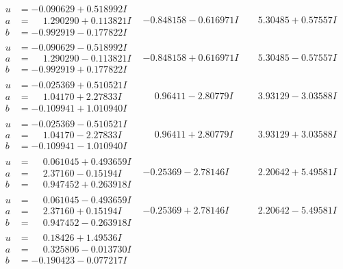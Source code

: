 \documentclass[1p]{elsarticle_modified}
\theoremstyle{definition}
\begin{document}
$$\begin{array}{c|c|c}
\begin{aligned}
u &= -0.090629 + 0.518992 I \\
a &= \phantom{-}1.290290 + 0.113821 I \\
b &= -0.992919 - 0.177822 I\end{aligned}
 & -0.848158 - 0.616971 I & \phantom{-}5.30485 + 0.57557 I \\ \hline\begin{aligned}
u &= -0.090629 - 0.518992 I \\
a &= \phantom{-}1.290290 - 0.113821 I \\
b &= -0.992919 + 0.177822 I\end{aligned}
 & -0.848158 + 0.616971 I & \phantom{-}5.30485 - 0.57557 I \\ \hline\begin{aligned}
u &= -0.025369 + 0.510521 I \\
a &= \phantom{-}1.04170 + 2.27833 I \\
b &= -0.109941 + 1.010940 I\end{aligned}
 & \phantom{-}0.96411 - 2.80779 I & \phantom{-}3.93129 - 3.03588 I \\ \hline\begin{aligned}
u &= -0.025369 - 0.510521 I \\
a &= \phantom{-}1.04170 - 2.27833 I \\
b &= -0.109941 - 1.010940 I\end{aligned}
 & \phantom{-}0.96411 + 2.80779 I & \phantom{-}3.93129 + 3.03588 I \\ \hline\begin{aligned}
u &= \phantom{-}0.061045 + 0.493659 I \\
a &= \phantom{-}2.37160 - 0.15194 I \\
b &= \phantom{-}0.947452 + 0.263918 I\end{aligned}
 & -0.25369 - 2.78146 I & \phantom{-}2.20642 + 5.49581 I \\ \hline\begin{aligned}
u &= \phantom{-}0.061045 - 0.493659 I \\
a &= \phantom{-}2.37160 + 0.15194 I \\
b &= \phantom{-}0.947452 - 0.263918 I\end{aligned}
 & -0.25369 + 2.78146 I & \phantom{-}2.20642 - 5.49581 I \\ \hline\begin{aligned}
u &= \phantom{-}0.18426 + 1.49536 I \\
a &= \phantom{-}0.325806 - 0.013730 I \\
b &= -0.190423 - 0.077217 I\end{aligned}

\end{array}$$
\end{document}
